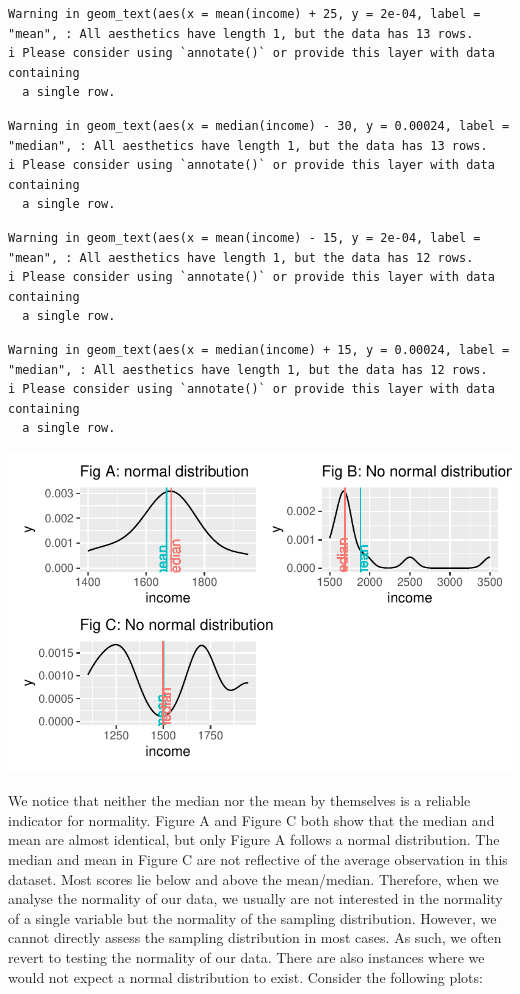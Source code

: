 \documentclass[
  letterpaper,
]{krantz}
\begin{document}
\begin{verbatim}
Warning in geom_text(aes(x = mean(income) + 25, y = 2e-04, label = "mean", : All aesthetics have length 1, but the data has 13 rows.
i Please consider using `annotate()` or provide this layer with data containing
  a single row.
\end{verbatim}

\begin{verbatim}
Warning in geom_text(aes(x = median(income) - 30, y = 0.00024, label = "median", : All aesthetics have length 1, but the data has 13 rows.
i Please consider using `annotate()` or provide this layer with data containing
  a single row.
\end{verbatim}

\begin{verbatim}
Warning in geom_text(aes(x = mean(income) - 15, y = 2e-04, label = "mean", : All aesthetics have length 1, but the data has 12 rows.
i Please consider using `annotate()` or provide this layer with data containing
  a single row.
\end{verbatim}

\begin{verbatim}
Warning in geom_text(aes(x = median(income) + 15, y = 0.00024, label = "median", : All aesthetics have length 1, but the data has 12 rows.
i Please consider using `annotate()` or provide this layer with data containing
  a single row.
\end{verbatim}

\includegraphics{09_sources_of_bias_files/figure-pdf/comparing-distributions-plus-means-1.pdf}

We notice that neither the median nor the mean by themselves is a
reliable indicator for normality. Figure A and Figure C both show that
the median and mean are almost identical, but only Figure A follows a
normal distribution. The median and mean in Figure C are not reflective
of the average observation in this dataset. Most scores lie below and
above the mean/median. Therefore, when we analyse the normality of our
data, we usually are not interested in the normality of a single
variable but the normality of the sampling distribution. However, we
cannot directly assess the sampling distribution in most cases. As such,
we often revert to testing the normality of our data. There are also
instances where we would not expect a normal distribution to exist.
Consider the following plots:
\end{document}
